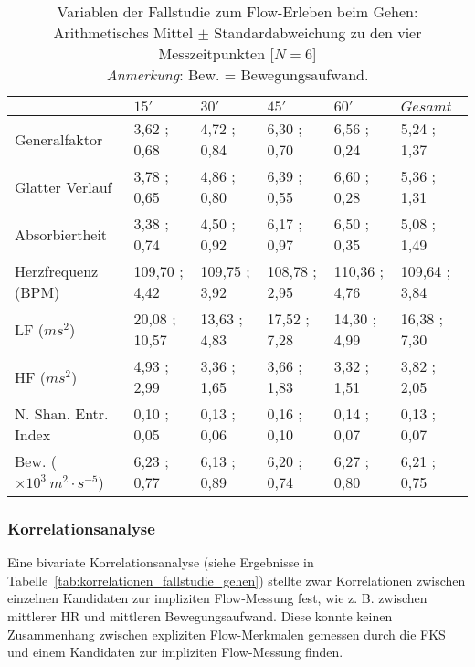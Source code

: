 \begin{sidewaystable}
\centering
	\caption[Variablen zu den vier Messzeitpunkten (Fallstudie: Gehen)]{Variablen der Fallstudie zum Flow-Erleben beim Gehen: Arithmetisches Mittel $\pm$ Standardabweichung zu den vier Messzeitpunkten [$N = 6$] \\ \hspace{\textwidth}\emph{Anmerkung}: Bew. = Bewegungsaufwand.}	
	\label{tab:variablen_nach_messzeitpunkt_fallstudie_gehen}
	\begin{tabular}{lyyyyy}
\toprule
& $15'$ & $30'$ & $45'$ & $60'$ & $Gesamt$ \\
\midrule
Generalfaktor & 3{,}62 ; 0{,}68 & 4{,}72 ; 0{,}84 & 6{,}30 ; 0{,}70 & 6{,}56 ; 0{,}24 & 5{,}24 ; 1{,}37 \\
Glatter Verlauf & 3{,}78 ; 0{,}65 & 4{,}86 ; 0{,}80 & 6{,}39 ; 0{,}55 & 6{,}60 ; 0{,}28 & 5{,}36 ; 1{,}31 \\
Absorbiertheit & 3{,}38 ; 0{,}74 & 4{,}50 ; 0{,}92 & 6{,}17 ; 0{,}97 & 6{,}50 ; 0{,}35 & 5{,}08 ; 1{,}49 \\
Herzfrequenz (BPM) & 109{,}70 ; 4{,}42 & 109{,}75 ; 3{,}92 & 108{,}78 ; 2{,}95 & 110{,}36 ; 4{,}76 & 109{,}64 ; 3{,}84 \\
LF ($ms^2$) & 20{,}08 ; 10{,}57 & 13{,}63 ; 4{,}83 & 17{,}52 ; 7{,}28 & 14{,}30 ; 4{,}99 & 16{,}38 ; 7{,}30 \\
HF ($ms^2$) & 4{,}93 ; 2{,}99 & 3{,}36 ; 1{,}65 & 3{,}66 ; 1{,}83 & 3{,}32 ; 1{,}51 & 3{,}82 ; 2{,}05 \\
N. Shan. Entr. Index & 0{,}10 ; 0{,}05 & 0{,}13 ; 0{,}06 & 0{,}16 ; 0{,}10 & 0{,}14 ; 0{,}07 & 0{,}13 ; 0{,}07 \\
Bew. ($\times 10^3 \: m^2 \cdot s^{-5}$) & 6{,}23 ; 0{,}77 & 6{,}13 ; 0{,}89 & 6{,}20 ; 0{,}74 & 6{,}27 ; 0{,}80 & 6{,}21 ; 0{,}75 \\
\bottomrule
\end{tabular}
\end{sidewaystable}

\subsubsection{Korrelationsanalyse}
\label{subs:korrelationsanalyse_1}
Eine bivariate Korrelationsanalyse (siehe Ergebnisse in Tabelle~\ref{tab:korrelationen_fallstudie_gehen}) stellte zwar Korrelationen zwischen einzelnen Kandidaten zur impliziten Flow-Messung fest, wie z. B. zwischen mittlerer \ac{HR} und mittleren Bewegungsaufwand. Diese konnte keinen Zusammenhang zwischen expliziten Flow-Merkmalen gemessen durch die \ac{FKS} und einem Kandidaten zur impliziten Flow-Messung finden.

